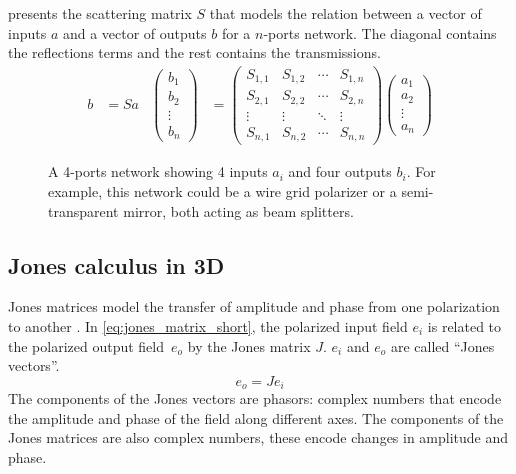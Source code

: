  presents the scattering matrix $S$ that models the relation between a vector of inputs $a$ and a vector of outputs $b$ for a $n$-ports network.
The diagonal contains the reflections terms and the rest contains the transmissions.
\begin{align}
    b &= S a
    &
    \begin{pmatrix}
        b_1\\
        b_2\\
        \vdots\\
        b_n
    \end{pmatrix}
    &=
    \begin{pmatrix}
        S_{1, 1} & S_{1, 2} & \cdots & S_{1, n} \\
        S_{2, 1} & S_{2, 2} & \cdots & S_{2, n} \\
        \vdots   & \vdots   & \ddots & \vdots   \\
        S_{n, 1} & S_{n, 2} & \cdots & S_{n, n}
    \end{pmatrix}
    \begin{pmatrix}
        a_1\\
        a_2\\
        \vdots\\
        a_n
    \end{pmatrix}
    \label{eq:scattering_matrix}
\end{align}

\begin{figure}[hbtp]
    \centering
    
    \caption{A 4-ports network showing 4 inputs $a_i$ and four outputs $b_i$.  For example, this network could be a wire grid polarizer or a semi-transparent mirror, both acting as beam splitters.}%
    \label{fig:scattering_matrix_notations}
\end{figure}


\subsection{Jones calculus in 3D}

Jones matrices model the transfer of amplitude and phase from one polarization to another \cite{hecht2002optics}.
In \cref{eq:jones_matrix_short}, the polarized input field $e_i$ is related to the polarized output field~$e_o$ by the Jones matrix $J$.
$e_i$ and $e_o$ are called ``Jones vectors''.
\begin{equation}
    e_o = J e_i
    \label{eq:jones_matrix_short}
\end{equation}
The components of the Jones vectors are phasors: complex numbers that encode the amplitude and phase of the field along different axes.
The components of the Jones matrices are also complex numbers, these encode changes in amplitude and phase.

